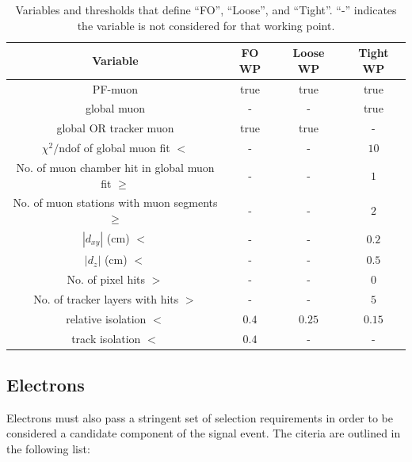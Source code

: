\begin{table}[!ht]
\centering
\begin{tabular}{|c|c|c|c|}
\hline
  Variable                                          & FO WP & Loose WP & Tight WP \\
\hline
  PF-muon                                           & true  & true     & true   \\
  global muon                                       & -     & -        & true   \\
  global OR tracker muon                            & true  & true     & -      \\
  $\chi^2/$ndof of global muon fit $<$              & -     & -        & $10$   \\
  No. of muon chamber hit in global muon fit $\geq$ & -     & -        & $1$    \\
  No. of muon stations with muon segments $\geq$    & -     & -        & $2$    \\
  $|d_{xy}|$ (cm) $<$                               & -     & -        & $0.2$  \\
  $|d_z|$ (cm) $<$                                  & -     & -        & $0.5$  \\
  No. of pixel hits $>$                             & -     & -        & $0$    \\
  No. of tracker layers with hits $>$               & -     & -        & $5$    \\
  relative isolation $<$                            & $0.4$ & $0.25$   & $0.15$ \\
  track isolation $<$                               & $0.4$ & -        & -      \\
\hline
\end{tabular}
\caption{Variables and thresholds that define ``FO'', ``Loose'', and ``Tight''. ``-'' indicates the variable is not considered for that working point.}
\label{tab:muon_wp}
\end{table}

\subsection{Electrons}
\label{subsec:electrons}
Electrons must also pass a stringent set of selection requirements in order to be considered a candidate component of the signal event. The citeria are outlined in the following list:

